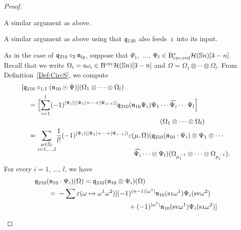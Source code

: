 \documentclass[\MainFolder/Text.tex]{subfiles}
\begin{document}
\begin{proof}
\begin{description}[font=\normalfont\itshape]
\item[$\OPQ_{210}\circ_{1,1}(\PMC_{l_1 g_1} \odot \PMC_{l_2 g_2})$, $(l_i,g_i) \neq (1,0)$:] A similar argument as above.
\item[$\OPQ_{120}\circ_1 \PMC_{lg}$, $(l,g)\neq(1,0)$:] A similar argument as above using that $\mathfrak{q}_{120}$ also feeds~$\NOne$ into its input. 
\item[$\OPQ_{210}\circ_{1,1} (\PMC_{10}\odot \PMC_{lg})$, $(l,g)\neq (1,0)$:] 
As in the case of $\mathfrak{q}_{210}\circ_2 \mathfrak{n}_{lg}$, suppose that $\Psi_1$,~$\dotsc$, $\Psi_l \in \mathrm{B}_{\mathrm{cyc},\mathrm{red}}^*\mathcal{H}(\mathbb{S}{n})[3-n]$. Recall that we write $\Omega_i = \mathrm{s} \omega_i \in \mathrm{B}^{\mathrm{cyc}} \mathcal{H}(\mathbb{S}{n})[3-n]$ and $\Omega = \Omega_1\otimes \dotsb \otimes \Omega_l$. From Definition~\ref{Def:CircS}, we compute
\allowdisplaybreaks
\begin{align*}
&[\OPQ_{210} \circ_{1,1}(\PMC_{10}\odot \Psi)](\Omega_1 \otimes \dotsb \otimes \Omega_l) 
\\ &\quad = \begin{multlined}[t] \Bigl[ \sum_{i=1}^l (-1)^{\Abs{\Psi_i}(\Abs{\Psi_1} + \dotsb + \Abs{\Psi_{i-1}})} \OPQ_{210}(\PMC_{10}\Psi_i)\Psi_1\cdots \widehat{\Psi_i}\cdots \Psi_l\Bigr]\\ (\Omega_1 \otimes \dotsb \otimes \Omega_l) \end{multlined} \\ 
 &\quad = \begin{multlined}[t] \vphantom{\sum_{i}}\smash{\sum_{\substack{\mu \in \Perm_l \\ i=1, \dotsc, l}}} \frac{1}{l!} (-1)^{\Abs{\Psi_i}(\Abs{\Psi_1} + \dotsb + \Abs{\Psi_{i-1}})} \varepsilon(\mu,\Omega) (\OPQ_{210}(\PMC_{10}\cdot\Psi_i)\otimes \Psi_1\otimes \dotsb \\ \widehat{\Psi_i}\dotsb\otimes \Psi_l)(\Omega_{\mu_1^{-1}} \otimes \dotsb \otimes \Omega_{\mu_l^{-1}}). \end{multlined}
\end{align*}
For every $i=1$, $\dotsc$, $l$, we have
\allowdisplaybreaks
 \begin{align*} 
 & \OPQ_{210}(\PMC_{10}\cdot \Psi_i)(\Omega) = \OPQ_{210}(\PMC_{10}\otimes \Psi_i)(\Omega) \\
 & \qquad = \begin{multlined}[t]- \sum \varepsilon(\omega\mapsto \omega^1 \omega^2)[(-1)^{(n-1)\Abs{\omega^1}} \PMC_{10}(\Susp \NOne \omega^1) \Psi_i(\Susp \NVol \omega^2) \\ {}+ (-1)^{\Abs{\omega^1}} \PMC_{10}(\Susp \NVol \omega^1) \Psi_i(\Susp \NOne \omega^2)] \end{multlined} \\ 

\end{align*}
\end{description}
\end{proof}
\end{document}
